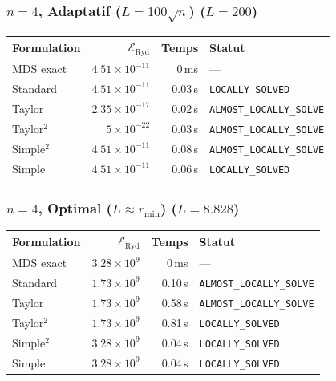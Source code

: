 \subsubsection{$n=4$, Adaptatif ($L{=}100\sqrt{n}$) ($L=200$)}
\begin{longtable}{@{}lrrl@{}}
  \toprule
  Formulation & $\mathcal{E}_{\mathrm{Ryd}}$ & Temps & Statut \\
  \midrule
  \endhead
  MDS exact & $4.51\times10^{-11}$ & 0\,ms & --- \\
  Standard & $4.51\times10^{-11}$ & 0.03\,s & \texttt{LOCALLY\_SOLVED} \\
  Taylor & $2.35\times10^{-17}$ & 0.02\,s & \texttt{ALMOST\_LOCALLY\_SOLVE} \\
  Taylor$^2$ & $5\times10^{-22}$ & 0.03\,s & \texttt{ALMOST\_LOCALLY\_SOLVE} \\
  Simple$^2$ & $4.51\times10^{-11}$ & 0.08\,s & \texttt{ALMOST\_LOCALLY\_SOLVE} \\
  Simple & $4.51\times10^{-11}$ & 0.06\,s & \texttt{LOCALLY\_SOLVED} \\
  \bottomrule
\end{longtable}

\subsubsection{$n=4$, Optimal ($L{\approx}r_{\min}$) ($L=8.828$)}
\begin{longtable}{@{}lrrl@{}}
  \toprule
  Formulation & $\mathcal{E}_{\mathrm{Ryd}}$ & Temps & Statut \\
  \midrule
  \endhead
  MDS exact & $3.28\times10^{9}$ & 0\,ms & --- \\
  Standard & $1.73\times10^{9}$ & 0.10\,s & \texttt{ALMOST\_LOCALLY\_SOLVE} \\
  Taylor & $1.73\times10^{9}$ & 0.58\,s & \texttt{ALMOST\_LOCALLY\_SOLVE} \\
  Taylor$^2$ & $1.73\times10^{9}$ & 0.81\,s & \texttt{LOCALLY\_SOLVED} \\
  Simple$^2$ & $3.28\times10^{9}$ & 0.04\,s & \texttt{LOCALLY\_SOLVED} \\
  Simple & $3.28\times10^{9}$ & 0.04\,s & \texttt{LOCALLY\_SOLVED} \\
  \bottomrule
\end{longtable}

